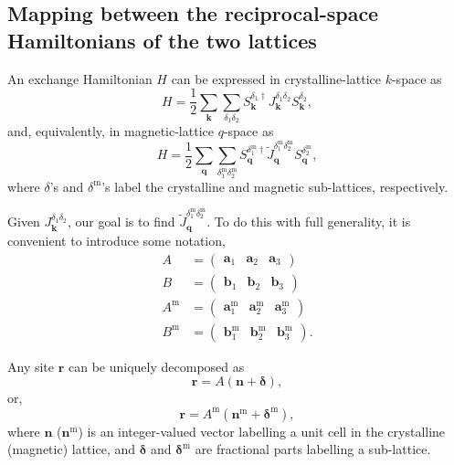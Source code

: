 \documentclass[12pt, a4paper]{article}
\newcommand{\m}{\textrm{m}}
\begin{document}
\subsection{Mapping between the reciprocal-space Hamiltonians of the two lattices}

An exchange Hamiltonian $H$ can be expressed in crystalline-lattice $k$-space as
\begin{equation}
  H=\frac{1}{2}\sum_{\bm{k}}\sum_{\delta_1\delta_2}S^{\delta_1\dagger}_{\bm{k}}J^{\delta_1\delta_2}_{\bm{k}}S^{\delta_2}_{\bm{k}},
\end{equation}
and, equivalently, in magnetic-lattice $q$-space  as
\begin{equation}
  H=\frac{1}{2}\sum_{\bm{q}}\sum_{\delta_1^{\m}\delta_2^{\m}}S^{\delta_1^{\m}\dagger}_{\bm{q}}\tilde{J}^{\delta_1^{\m}\delta_2^{\m}}_{\bm{q}}S^{\delta_2^{\m}}_{\bm{q}},
\end{equation}
where $\delta$'s and $\delta^{\m}$'s label the crystalline and magnetic sub-lattices, respectively.

Given $J^{\delta_1\delta_2}_{\bm{k}}$, our goal is to find $\tilde{J}^{\delta_1^{\m}\delta_2^{\m}}_{\bm{q}}$. To do this with full generality, it is convenient to introduce some notation,
\begin{align}
  A &=  \begin{pmatrix}
    \bm{a}_1&
    \bm{a}_2&
    \bm{a}_3
  \end{pmatrix}\\
  B &=  \begin{pmatrix}
    \bm{b}_1&
    \bm{b}_2&
    \bm{b}_3
  \end{pmatrix}\\
  A^{\m} &=  \begin{pmatrix}
    \bm{a}^{\m}_1&
    \bm{a}^{\m}_2&
    \bm{a}^{\m}_3
  \end{pmatrix}\\
  B^{\m}&=  \begin{pmatrix}
    \bm{b}^{\m}_1&
    \bm{b}^{\m}_2&
    \bm{b}^{\m}_3
  \end{pmatrix}.
\end{align}

Any site $\bm{r}$ can be uniquely decomposed as
\begin{equation}
  \bm{r}=A(\bm{n}+\bm{\delta}),
\end{equation}
or, 
\begin{equation}
   \bm{r}= A^{\m}(\bm{n}^{\m}+\bm{\delta}^{\m}),
\end{equation}
where $\bm{n}$ ($\bm{n}^{\m}$) is an integer-valued vector labelling a unit cell in the crystalline (magnetic) lattice, and $\bm{\delta}$ and $\bm{\delta}^{\m}$ are fractional parts labelling a sub-lattice.
\end{document}
